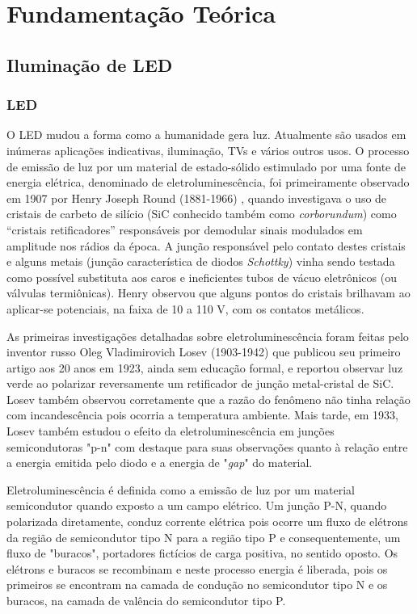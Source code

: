 \chapter{Fundamentação Teórica}

\section{Iluminação de LED}

\subsection{LED}

O \acf{LED} mudou a forma como a humanidade gera luz. Atualmente são usados em inúmeras aplicações indicativas, iluminação, TVs e vários outros usos. O processo de emissão de luz por um material de estado-sólido estimulado por uma fonte de energia elétrica, denominado de eletroluminescência, foi primeiramente observado em 1907 por Henry Joseph Round (1881-1966) \cite{led}, quando investigava o uso de cristais de carbeto de silício (SiC conhecido também como \textit{corborundum}) como ``cristais retificadores'' responsáveis por demodular sinais modulados em amplitude nos rádios da época. A junção responsável pelo contato destes cristais e alguns metais (junção característica de diodos \textit{Schottky}) vinha sendo testada como possível substituta aos caros e ineficientes tubos de vácuo eletrônicos (ou válvulas termiônicas). Henry observou que alguns pontos do cristais brilhavam ao aplicar-se potenciais, na faixa de 10 a 110 V, com os contatos metálicos.

As primeiras investigações detalhadas sobre eletroluminescência foram feitas pelo inventor russo Oleg Vladimirovich Losev (1903-1942) que publicou seu primeiro artigo aos 20 anos em 1923, ainda sem educação formal, e reportou observar luz verde ao polarizar reversamente um retificador de junção metal-cristal de SiC. Losev também observou corretamente que a razão do fenômeno não tinha relação com incandescência pois ocorria a temperatura ambiente. Mais tarde, em 1933, Losev também estudou o efeito da eletroluminescência em junções semicondutoras "p-n" com destaque para suas observações quanto à relação entre a energia emitida pelo diodo e a energia de "\textit{gap}" do material.

Eletroluminescência é definida como a emissão de luz por um material semicondutor quando exposto a um campo elétrico. Um junção P-N, quando polarizada diretamente, conduz corrente elétrica pois ocorre um fluxo de elétrons da região de semicondutor tipo N para a região tipo P e consequentemente, um fluxo de "buracos", portadores fictícios de carga positiva, no sentido oposto. Os elétrons e buracos se recombinam e neste processo energia é liberada, pois os primeiros se encontram na camada de condução no semicondutor tipo N e os buracos, na camada de valência do semicondutor tipo P.

